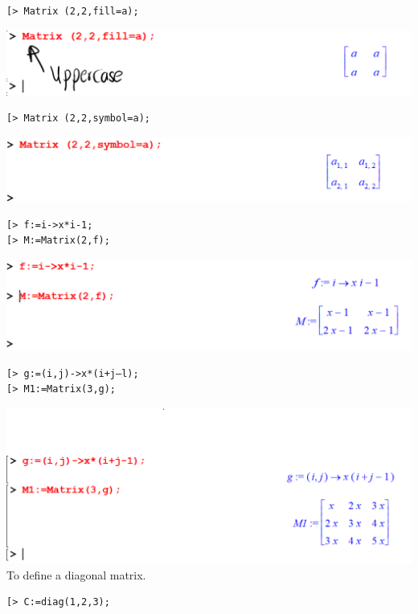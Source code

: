 \documentclass[
]{book}
\theoremstyle{definition}
\theoremstyle{definition}
\theoremstyle{definition}
\theoremstyle{definition}
\theoremstyle{remark}
\begin{document}
\begin{verbatim}
[> Matrix (2,2,fill=a);
\end{verbatim}

\includegraphics{figures/Lesson 4/fig5.png}

\begin{verbatim}
[> Matrix (2,2,symbol=a);
\end{verbatim}

\includegraphics{figures/Lesson 4/fig6.png}

\begin{verbatim}
[> f:=i->x*i-1;
[> M:=Matrix(2,f);
\end{verbatim}

\includegraphics{figures/Lesson 4/fig7.png}

\begin{verbatim}
[> g:=(i,j)->x*(i+j—l);
[> M1:=Matrix(3,g);
\end{verbatim}

\includegraphics{figures/Lesson 4/fig8.png} To define a diagonal matrix.

\begin{verbatim}
[> C:=diag(1,2,3);
\end{verbatim}
\end{document}
